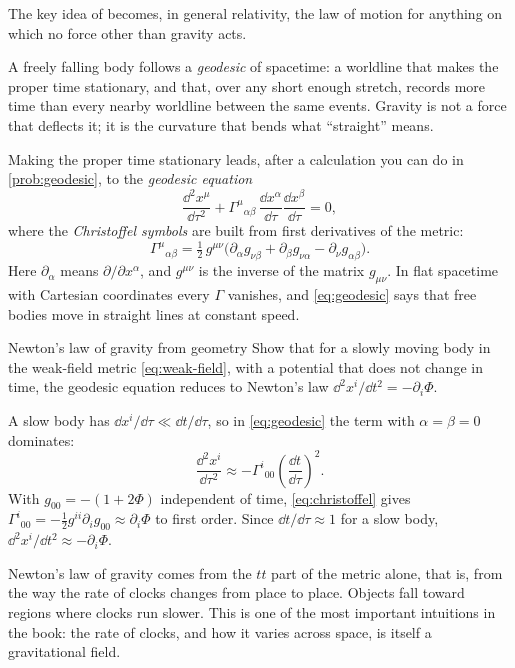The key idea of  becomes, in general relativity, the
law of motion for anything on which no force other than gravity acts.

\begin{keyidea}
A freely falling body follows a \emph{geodesic} of spacetime: a worldline that
makes the proper time stationary, and that, over any short enough stretch,
records more time than every nearby worldline between the same events.
Gravity is not a force that deflects it; it is the curvature that bends what
\enquote{straight} means.
\end{keyidea}

Making the proper time stationary leads, after a calculation you can do in
\cref{prob:geodesic}, to the \emph{geodesic equation}
\begin{equation}
  \frac{\dd^{2}x^{\mu}}{\dd\tau^{2}}
  + \Gamma^{\mu}{}_{\alpha\beta}\,\frac{\dd x^{\alpha}}{\dd\tau}\frac{\dd x^{\beta}}{\dd\tau} = 0,
  \label{eq:geodesic}
\end{equation}
where the \emph{Christoffel symbols} are built from first derivatives of the
metric:
\begin{equation}
  \Gamma^{\mu}{}_{\alpha\beta} = \tfrac{1}{2}\,g^{\mu\nu}
  \bigl(\partial_{\alpha}g_{\nu\beta} + \partial_{\beta}g_{\nu\alpha}
  - \partial_{\nu}g_{\alpha\beta}\bigr).
  \label{eq:christoffel}
\end{equation}
Here $\partial_{\alpha}$ means $\partial/\partial x^{\alpha}$, and $g^{\mu\nu}$ is
the inverse of the matrix $g_{\mu\nu}$. In flat spacetime with Cartesian
coordinates every $\Gamma$ vanishes, and \cref{eq:geodesic} says that free
bodies move in straight lines at constant speed.

\begin{example}[label=ex:newton, unbreakable]{Newton's law of gravity from geometry}
Show that for a slowly moving body in the weak-field metric
\cref{eq:weak-field}, with a potential that does not change in time, the
geodesic equation reduces to Newton's law $\dd^{2}x^{i}/\dd t^{2} = -\partial_{i}\Phi$.

\solution A slow body has $\dd x^{i}/\dd\tau \ll \dd t/\dd\tau$, so in
\cref{eq:geodesic} the term with $\alpha = \beta = 0$ dominates:
\begin{equation*}
  \frac{\dd^{2}x^{i}}{\dd\tau^{2}} \approx -\Gamma^{i}{}_{00}\left(\frac{\dd t}{\dd\tau}\right)^{2}.
\end{equation*}
With $g_{00} = -(1+2\Phi)$ independent of time, \cref{eq:christoffel} gives
$\Gamma^{i}{}_{00} = -\tfrac{1}{2}g^{ii}\partial_{i}g_{00} \approx \partial_{i}\Phi$
to first order. Since $\dd t/\dd\tau \approx 1$ for a slow body,
$\dd^{2}x^{i}/\dd t^{2} \approx -\partial_{i}\Phi$.

\discussion Newton's law of gravity comes from the $tt$ part of the metric
alone, that is, from the way the rate of clocks changes from place to place.
Objects fall toward regions where clocks run slower. This is one of the most
important intuitions in the book: the rate of clocks, and how it varies across
space, is itself a gravitational field.
\end{example}

